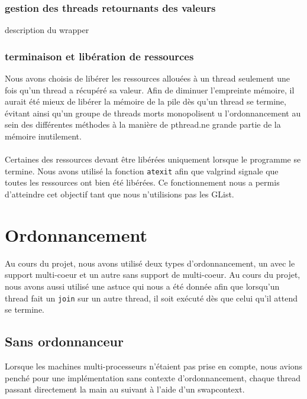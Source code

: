\documentclass{article}
\begin{document}
			\subsubsection{gestion des threads retournants des valeurs}
			description du wrapper
			
			\subsubsection{terminaison et libération de ressources}
            Nous avons choisis de libérer les ressources allouées à un thread
            seulement une fois qu'un thread a récupéré sa valeur. Afin de
            diminuer l'empreinte mémoire, il aurait été mieux de libérer
            la mémoire de la pile dès qu'un thread se termine, évitant ainsi
            qu'un groupe de threads morts monopolisent u
		l'ordonnancement au sein des différentes méthodes à la manière
        de pthread.ne grande partie de
            la mémoire inutilement.
            \paragraph{}
            Certaines des ressources devant être libérées uniquement lorsque
            le programme se termine. Nous avons utilisé la fonction
            \verb!atexit! afin que valgrind signale que toutes les
            ressources ont bien été libérées. Ce fonctionnement nous a permis
            d'atteindre cet objectif tant que nous n'utilisions pas les
            GList.
		

	\section{Ordonnancement}
    Au cours du projet, nous avons utilisé deux types d'ordonnancement, un
    avec le support multi-coeur et un autre sans support de multi-coeur. Au
    cours du projet, nous avons aussi utilisé une astuce qui nous a été
    donnée afin que lorsqu'un thread fait un \verb!join! sur un autre
    thread, il soit exécuté dès que celui qu'il attend se termine.

		\subsection{Sans ordonnanceur}
        Lorsque les machines multi-processeurs n'étaient pas prise en compte,
        nous avions penché pour une implémentation sans contexte
        d'ordonnancement, chaque thread passant directement la main au
        suivant à l'aide d'un swapcontext.
\end{document}
